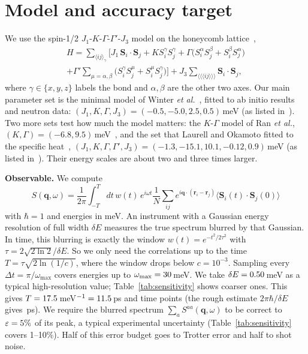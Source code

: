 \documentclass[conference]{IEEEtran}
\newcommand{\eps}{\varepsilon}
\begin{document}
\section{Model and accuracy target}\label{sec:target}

We use the spin-1/2 $J_1$-$K$-$\Gamma$-$\Gamma'$-$J_3$ model on the
honeycomb lattice~\cite{rau2014,winter2017},
\begin{multline}
H=\sum_{\langle ij\rangle_\gamma}\Big[J_1\,\mathbf S_i\!\cdot\!\mathbf S_j
+K S_i^\gamma S_j^\gamma
+\Gamma\big(S_i^\alpha S_j^\beta+S_i^\beta S_j^\alpha\big)\\
+\Gamma'\!\!\sum_{\mu=\alpha,\beta}\!\big(S_i^\gamma S_j^\mu+S_i^\mu S_j^\gamma\big)\Big]
+J_3\!\!\sum_{\langle\langle\langle ij\rangle\rangle\rangle}\!\!\mathbf S_i\!\cdot\!\mathbf S_j,
\end{multline}
where $\gamma\in\{x,y,z\}$ labels the bond and $\alpha,\beta$ are the other
two axes. Our main parameter set is the minimal model of Winter
\emph{et al.}~\cite{winter2017}, fitted to ab initio results and neutron
data: $(J_1,K,\Gamma,J_3)=(-0.5,-5.0,2.5,0.5)$\,meV (as listed
in~\cite{maksimov2020}). Two more sets test how much the model matters: the
$K$-$\Gamma$ model of Ran \emph{et al.},
$(K,\Gamma)=(-6.8,9.5)$\,meV~\cite{ran2017}, and the set that Laurell and
Okamoto fitted to the specific heat~\cite{laurell2020},
$(J_1,K,\Gamma,\Gamma',J_3)=(-1.3,-15.1,10.1,-0.12,0.9)$\,meV (as listed
in~\cite{meta2026}). Their energy scales are about two and three times
larger.

\textbf{Observable.} We compute
\begin{equation}
S(\mathbf q,\omega)=\frac{1}{2\pi}\!\int_{-T}^{T}\!\!dt\,w(t)\,e^{i\omega t}
\frac1N\sum_{ij}e^{i\mathbf q\cdot(\mathbf r_i-\mathbf r_j)}
\langle\mathbf S_i(t)\!\cdot\!\mathbf S_j(0)\rangle
\end{equation}
with $\hbar=1$ and energies in meV. An instrument with a Gaussian energy
resolution of full width $\delta E$ measures the true spectrum blurred by
that Gaussian. In time, this blurring is exactly the window
$w(t)=e^{-t^2/2\tau^2}$ with $\tau=2\sqrt{2\ln2}/\delta E$. So we only need
the correlations up to the time $T=\tau\sqrt{2\ln(1/c)}$, where the window
drops below $c=10^{-3}$. Sampling every $\Delta t=\pi/\omega_{\max}$ covers
energies up to $\omega_{\max}=30$\,meV. We take $\delta E=0.50$\,meV
as a typical high-resolution value; Table~\ref{tab:sensitivity} shows
coarser ones. This gives $T=17.5$\,meV$^{-1}=11.5$\,ps and \nTimes{} time
points (the rough estimate $2\pi\hbar/\delta E$ gives \TroughPs\,ps). We
require the blurred spectrum $\sum_a S^{aa}(\mathbf q,\omega)$ to be correct
to $\eps=\epsPct\%$ of its peak, a typical experimental uncertainty
(Table~\ref{tab:sensitivity} covers 1--10\%). Half of this error budget goes
to Trotter error and half to shot noise.
\end{document}
